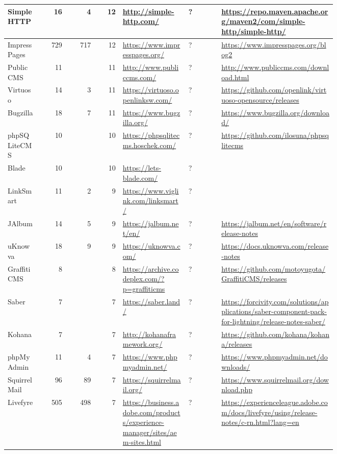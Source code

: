 \begin{landscape}
\begin{longtable}{|p{0.1\linewidth}|r|r|r|p{0.2\linewidth}|p{0.1\linewidth}|p{0.35\linewidth}|}
		SimpleHTTP &16 &4 &12 &\url{http://simple-http.com/} &? &\url{https://repo.maven.apache.org/maven2/com/simple-http/simple-http/} \\\hline
		ImpressPages &729 &717 &12 &\url{https://www.impresspages.org/} &? &\url{https://www.impresspages.org/blog2} \\\hline
		Public CMS &11 & &11 &\url{http://www.publiccms.com/} &? &\url{http://www.publiccms.com/download.html} \\\hline
		Virtuoso &14 &3 &11 &\url{https://virtuoso.openlinksw.com/} &? &\url{https://github.com/openlink/virtuoso-opensource/releases} \\\hline
		Bugzilla &18 &7 &11 &\url{https://www.bugzilla.org/} &? &\url{https://www.bugzilla.org/download/} \\\hline
		phpSQLiteCMS &10 & &10 &\url{https://phpsqlitecms.hoschek.com/} &? &\url{https://github.com/ilosuna/phpsqlitecms} \\\hline
		Blade &10 & &10 &\url{https://lets-blade.com/} &? & \\\hline
		LinkSmart &11 &2 &9 &\url{https://www.viglink.com/linksmart/} &? & \\\hline
		JAlbum &14 &5 &9 &\url{https://jalbum.net/en/} &? &\url{https://jalbum.net/en/software/release-notes} \\\hline
		uKnowva &18 &9 &9 &\url{https://uknowva.com/} &? &\url{https://docs.uknowva.com/release-notes} \\\hline
		Graffiti CMS &8 & &8 &\url{https://archive.codeplex.com/?p=graffiticms} &? &\url{https://github.com/motoyugota/GraffitiCMS/releases} \\\hline
		Saber &7 & &7 &\url{https://saber.land/} &? &\url{https://forcivity.com/solutions/applications/saber-component-pack-for-lightning/release-notes-saber/} \\\hline
		Kohana &7 & &7 &\url{http://kohanaframework.org/} &? &\url{https://github.com/kohana/kohana/releases} \\\hline
		phpMyAdmin &11 &4 &7 &\url{https://www.phpmyadmin.net/} &? &\url{https://www.phpmyadmin.net/downloads/} \\\hline
		SquirrelMail &96 &89 &7 &\url{https://squirrelmail.org/} &? &\url{https://www.squirrelmail.org/download.php} \\\hline
		Livefyre &505 &498 &7 &\url{https://business.adobe.com/products/experience-manager/sites/aem-sites.html} &? &\url{https://experienceleague.adobe.com/docs/livefyre/using/release-notes/c-rn.html?lang=en} \\\hline

\end{longtable}
\end{landscape}
